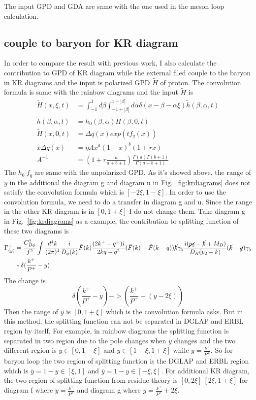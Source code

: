\documentclass[preprintnumbers,prd,superscriptaddress,preprint]{revtex4-1}
\begin{document}
	The input GPD and GDA are same with the one used in the meson loop
	calculation.
	
	\subsection{couple to baryon for KR diagram}
	In order to compare the result with previous work, I also calculate the contribution to GPD of KR diagram while the external filed couple to the baryon in KR diagrams and the input is polarized GPD $\tilde{H}$ of proton. The convolution formula is same with the rainbow diagrams and the input  $\tilde{H}$ is 
	\begin{align*}
		\tilde{H}(x,\xi,t) & =\int_{-1}^{1}d\beta\int_{-1+|\beta|}^{1-|\beta|}d\alpha\delta(x-\beta-\alpha\xi)\tilde{h}(\beta,\alpha,t)\\
		\tilde{h}(\beta,\alpha,t) & =h_{0}(\beta,\alpha)\tilde{H}(\beta,0,t)\\
		\tilde{H}(x,0,t) & =\Delta q(x)exp(tf_{q}(x))\\
		x\Delta q(x) & =\eta Ax^{a}(1-x)^{b}(1+rx)\\
		A^{-1} & =(1+r\frac{a}{a+b+1})\frac{\Gamma(a)\Gamma(b+1)}{\Gamma(a+b+1)}
	\end{align*}
	The $h_{0}\ f_{q}$ are same with the unpolarized GPD.
	As it's showed above, the range of $y$ in the additional the diagram g and diagram u in Fig.~\ref{fig:krdiagrams} does not satisfy the convolution formula which is $[-2\xi, 1-\xi]$. In order to use the convolution formula, we need to do a transfer in diagram g and u. Since the range in the other KR diagram is in $[0,1+\xi]$ I do not change them. 
	Take diagram g in Fig.~\ref{fig:krdiagrams} as a example, the contribution to splitting function of these two diagrams is 
	\begin{align*}
		\Gamma_{(g)}^{+} & =\frac{C_{B\phi}^{2}}{f^{2}}\int\frac{d^{4}k}{(2\pi)^{4}}\frac{i}{D_{\phi}(k)}\tilde{F}(k)\frac{(2k^{+}-q^{+})i}{2kq-q^{2}}(\tilde{F}(k)-\tilde{F}(k-q))\cancel{k}\gamma_{5}\frac{i(\cancel{p_{2}}-\cancel{k}+M_{B})}{D_{B}(p_{2}-k)}(\cancel{k}-\cancel{q})\gamma_{5}\\
		& *\delta(\frac{k^{+}}{P^{+}}-y)
	\end{align*}
	The change is 
	\[\delta(\frac{k^{+}}{P^{+}}-y)->(\frac{k^{+}}{P^{+}}-(y-2\xi))\]
	Then the range of $y$ is $[0,1+\xi]$ which is the convolution formula asks. But in this method, the splitting function can not be separated in DGLAP and ERBL region by itself. For example, in rainbow diagrams the splitting function is separated in two region due to the pole changes when $y$ changes and the two different region is $y\in[0,1-\xi]$ and $y\in[1-\xi,1+\xi]$ while $y=\frac{k^{+}}{P^{+}}$. So for baryon loop the two region of splitting function is the DGLAP and ERBL region which is  $\bar{y}=1-y\in[\xi,1]$ and $\bar{y}=1-y\in[-\xi,\xi]$. For additional KR diagram, the two region of splitting function from residue theory is $[0,2\xi]\ [2\xi,1+\xi]$ for diagram f where $y=\frac{k^{+}}{P^{+}}$ and diagram g where $y=\frac{k^{+}}{P^{+}}+2\xi$. 
	
\end{document}
